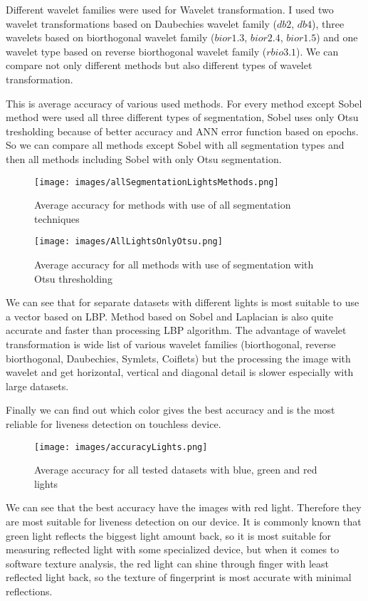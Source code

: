 \documentclass{article}
\begin{document}
Different wavelet families were used for Wavelet transformation. I used two wavelet transformations based on Daubechies wavelet family ($db2$, $db4$), three wavelets based on biorthogonal wavelet family ($bior1.3$, $bior2.4$, $bior1.5$) and one wavelet type based on reverse biorthogonal wavelet family ($rbio3.1$). We can compare not only different methods but also different types of wavelet transformation.

This is average accuracy of various used methods. For every method except Sobel method were used all three different types of segmentation, Sobel uses only Otsu tresholding because of better accuracy and ANN error function based on epochs. So we can compare all methods except Sobel with all segmentation types and then all methods including Sobel with only Otsu segmentation.

\begin{figure}[!htbp]
    \centering
    \texttt{[image: images/allSegmentationLightsMethods.png]}
    \caption{Average accuracy for methods with use of all segmentation techniques}
\end{figure}

\begin{figure}[!htbp]
    \centering
    \texttt{[image: images/AllLightsOnlyOtsu.png]}
    \caption{Average accuracy for all methods with use of segmentation with Otsu thresholding}
\end{figure}

We can see that for separate datasets with different lights is most suitable to use a vector based on LBP. Method based on Sobel and Laplacian is also quite accurate and faster than processing LBP algorithm. The advantage of wavelet transformation is wide list of various wavelet families (biorthogonal, reverse biorthogonal, Daubechies, Symlets, Coiflets) but the processing the image with wavelet and get horizontal, vertical and diagonal detail is slower especially with large datasets.

Finally we can find out which color gives the best accuracy and is the most reliable for liveness detection on touchless device.

\begin{figure}[!htbp]
    \centering
    \texttt{[image: images/accuracyLights.png]}
    \caption{Average accuracy for all tested datasets with blue, green and red lights}
\end{figure}

We can see that the best accuracy have the images with red light. Therefore they are most suitable for liveness detection on our device. It is commonly known that green light reflects the biggest light amount back, so it is most suitable for measuring reflected light with some specialized device, but when it comes to software texture analysis, the red light can shine through finger with least reflected light back, so the texture of fingerprint is most accurate with minimal reflections.
\end{document}
